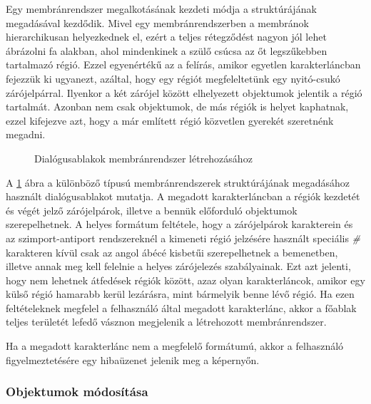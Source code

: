 Egy membránrendszer megalkotásának kezdeti módja a struktúrájának megadásával kezdődik. Mivel egy membránrendszerben a membránok hierarchikusan helyezkednek el, ezért a teljes rétegződést nagyon jól lehet ábrázolni fa alakban, ahol mindenkinek a szülő csúcsa az őt legszűkebben tartalmazó régió. Ezzel egyenértékű az a felírás, amikor egyetlen karakterláncban fejezzük ki ugyanezt, azáltal, hogy egy régiót megfeleltetünk egy nyitó-csukó zárójelpárral. Ilyenkor a két zárójel között elhelyezett objektumok jelentik a régió tartalmát. Azonban nem csak objektumok, de más régiók is helyet kaphatnak, ezzel kifejezve azt, hogy a már említett régió közvetlen gyerekét szeretnénk megadni. 

\begin{figure}[H]
	\centering
	\vspace{5pt}
	\caption{Dialógusablakok membránrendszer létrehozásához}
	\label{fig:create_system}
\end{figure}

A \ref{fig:create_system} ábra a különböző típusú membránrendszerek struktúrájának megadásához használt dialógusablakot mutatja. A megadott karakterláncban a régiók kezdetét és végét jelző zárójelpárok, illetve a bennük előforduló objektumok szerepelhetnek.
A helyes formátum feltétele, hogy a zárójelpárok karakterein és az szimport-antiport rendszereknél a kimeneti régió jelzésére használt speciális \textit{\#} karakteren kívül csak az angol ábécé kisbetűi szerepelhetnek a bemenetben, illetve annak meg kell felelnie a helyes zárójelezés szabályainak. Ezt azt jelenti, hogy nem lehetnek átfedések régiók között, azaz olyan karakterláncok, amikor egy külső régió hamarabb kerül lezárásra, mint bármelyik benne lévő régió. Ha ezen feltételeknek megfelel a felhasználó által megadott karakterlánc, akkor a főablak teljes területét lefedő vásznon megjelenik a létrehozott membránrendszer.

Ha a megadott karakterlánc nem a megfelelő formátumú, akkor a felhasználó figyelmeztetésére egy hibaüzenet jelenik meg a képernyőn. 

\subsubsection{Objektumok módosítása}

